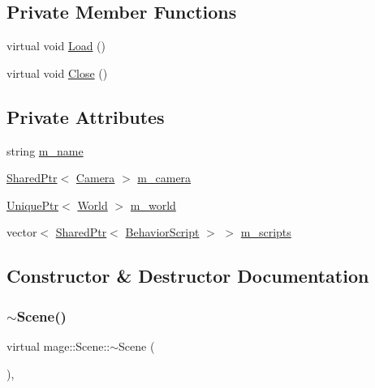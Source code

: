 \subsection*{Private Member Functions}
\begin{DoxyCompactItemize}
\item 
virtual void \hyperlink{classmage_1_1_scene_a1fb4a93eaa2f6a9e20594e205abb9a32}{Load} ()
\item 
virtual void \hyperlink{classmage_1_1_scene_a16786d7fcf0b813e2e94061b082cfd1d}{Close} ()
\end{DoxyCompactItemize}
\subsection*{Private Attributes}
\begin{DoxyCompactItemize}
\item 
string \hyperlink{classmage_1_1_scene_a6cc8cb08b1853c4e3063b33a94e8fb47}{m\+\_\+name}
\item 
\hyperlink{namespacemage_a1e01ae66713838a7a67d30e44c67703e}{Shared\+Ptr}$<$ \hyperlink{classmage_1_1_camera}{Camera} $>$ \hyperlink{classmage_1_1_scene_a961c280659f9934441d8e835508e933d}{m\+\_\+camera}
\item 
\hyperlink{namespacemage_a8c307fbcc33bce9b7f2aa4c26c3b95cf}{Unique\+Ptr}$<$ \hyperlink{classmage_1_1_world}{World} $>$ \hyperlink{classmage_1_1_scene_a0d06149d881166497bf75ae2288bf960}{m\+\_\+world}
\item 
vector$<$ \hyperlink{namespacemage_a1e01ae66713838a7a67d30e44c67703e}{Shared\+Ptr}$<$ \hyperlink{classmage_1_1_behavior_script}{Behavior\+Script} $>$ $>$ \hyperlink{classmage_1_1_scene_a84548bf6978f8955ce5892cb23536a4e}{m\+\_\+scripts}
\end{DoxyCompactItemize}


\subsection{Constructor \& Destructor Documentation}
\hypertarget{classmage_1_1_scene_a0db784091e75a472b20088ba7f1c2b26}{}\label{classmage_1_1_scene_a0db784091e75a472b20088ba7f1c2b26} 
\subsubsection{\texorpdfstring{$\sim$\+Scene()}{~Scene()}}
{\footnotesize\ttfamily virtual mage\+::\+Scene\+::$\sim$\+Scene (\begin{DoxyParamCaption}{ }\end{DoxyParamCaption})\hspace{0.3cm}{\ttfamily [virtual]}, {\ttfamily [default]}}

